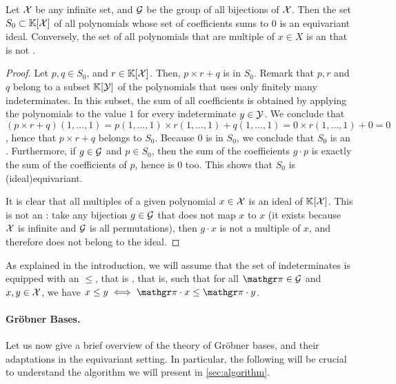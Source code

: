 \begin{example}
    \label{ex:idl-equiv}
    Let $\mathcal{X}$ be any infinite set, and $\mathcal{G}$ be the 
    group of all bijections of $\mathcal{X}$. 
    Then the set $S_0 \subset \mathbb{K}[\mathcal{X}]$ of all polynomials 
    whose set of coefficients sums to $0$ is an equivariant ideal.
    Conversely, the set of all polynomials that are multiple
    of $x \in X$ is an  that is not .
\end{example}
\begin{proof}
    Let $p,q\in S_0$, and $r \in \mathbb{K}[\mathcal{X}]$.
    Then, $p \times r + q$ is in $S_0$. Remark that 
    $p,r$ and $q$ belong to a subset $\mathbb{K}[\mathcal{Y}]$ of the 
    polynomials that uses only finitely many indeterminates.
    In this subset, the sum of all coefficients is obtained
    by applying the polynomials to the value $1$ for every indeterminate
    $y \in \mathcal{Y}$. We conclude that
    $(p \times r + q)(1,\dots, 1) 
    = p(1,\dots,1) \times r(1,\dots,1) + q(1,\dots,1)
    = 0 \times r(1, \dots, 1) + 0 = 0$, hence that
    $p \times r + q$ belongs to $S_0$. 
    Because $0$ is in $S_0$, we conclude that $S_0$ is an .
    Furthermore, if $g \in \mathcal{G}$ and $p \in S_0$, then
    the sum of the coefficients $g \cdot p$ is exactly
    the sum of the coefficients of $p$, hence is $0$ too.
    This shows that $S_0$ is \kl(ideal){equivariant}.

    It is clear that all multiples of a given polynomial $x \in \mathcal{X}$
    is an ideal of $\mathbb{K}[\mathcal{X}]$. This is not an :
    take any bijection $g \in \mathcal{G}$ that does not map $x$ to $x$ (it
    exists because $\mathcal{X}$ is infinite and $\mathcal{G}$ is all permutations),
    then $g \cdot x$ is not a multiple of $x$, and therefore does 
    not belong to the ideal.
\end{proof}

As explained in the introduction, we will assume that the set of indeterminates
is equipped with an  $\leq$, that is , that is, such that for all $\gelem
\in \group$ and $x,y \in \mathcal{X}$, we have $x \leq y \iff \gelem \cdot x \leq \gelem \cdot y$.



\paragraph{Gröbner Bases.} \AP
Let us now give a brief overview of the theory of Gröbner bases, and their 
adaptations in the equivariant setting. In particular, the following 
will be crucial to understand the algorithm we will present in \cref{sec:algorithm}.

